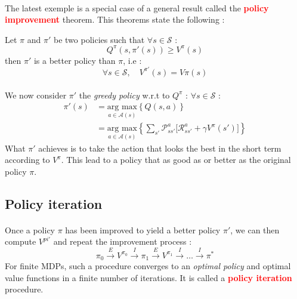 \documentclass[a4paper]{article}
\begin{document}
{{			\paragraph{} The latest exemple is a special case of a general result called the \textbf{\textcolor{red}{policy improvement}} theorem. This theorems state the following : 
			\vspace{10pt}
			
			{
				Let $\pi$ and $\pi'$ be two policies such that $\forall s \in\mathcal{S}$ : 
				\begin{equation}
					Q^\pi(s,\pi'(s)) \geq V^\pi(s) 
				\end{equation}
				then $\pi'$ is a better policy than $\pi$, i.e : 
				\begin{equation}
					\forall{s}\in\mathcal{S}, \quad V^{\pi'}(s) = V\pi(s)
				\end{equation}
			}
			
			\paragraph{} We now consider $\pi'$ the \emph{greedy policy} w.r.t to $Q^\pi$ : $\forall{s}\in\mathcal{S}$ : 
			\begin{equation}
				\begin{aligned}
					\pi'(s) &= \underset{a\in\mathcal{A}(s)}{\text{arg max}} \left\{ Q(s,a) \right \} \\
						 &=  \underset{a\in\mathcal{A}(s)}{\text{arg max}} \left\{ \sum_{s'}\mathcal{P}_{ss'}^a\big[ \mathcal{R}_{ss'}^a + \gamma V^\pi(s')\big] \right \} 
				\end{aligned}
			\end{equation}
			What $\pi'$ achieves is to take the action that looks the best in the short term according to $V^\pi$. This lead to a policy that as good as or better as the original policy $\pi$. 
		}
		
		\subsection{Policy iteration}
		{
			\paragraph{} Once a policy $\pi$ has been improved to yield a better policy $\pi'$, we can then compute $V^{pi'}$ and repeat the improvement process : 
			\begin{equation}
				\pi_0 \overset{E}{\longrightarrow} V^{\pi_0} \overset{I}{\longrightarrow} \pi_1 \overset{E}{\longrightarrow} V^{\pi_1} \overset{I}{\longrightarrow} \hdots \overset{I}{\longrightarrow} \pi^*
			\end{equation}
			For finite MDPs, such a procedure converges to an \emph{optimal policy} and optimal value functions in a finite number of iterations. It is called a \textbf{\textcolor{red}{policy iteration}} procedure. 
			\vspace{10pt}
			
}}
\end{document}
